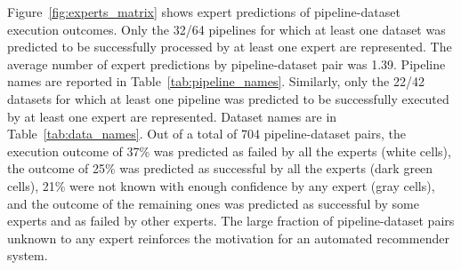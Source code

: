 \documentclass[conference]{IEEEtran}
\begin{document}
Figure~\ref{fig:experts_matrix} shows expert predictions of
pipeline-dataset execution outcomes. Only the 32/64 pipelines for which at
least one dataset was predicted to be successfully processed by at least
one expert are represented. The average number of expert predictions by pipeline-dataset pair was 1.39. Pipeline names are reported in
Table~\ref{tab:pipeline_names}. Similarly, only the 22/42 datasets for which
at least one pipeline was predicted to be successfully executed by at least
one expert are represented. Dataset names are in Table~\ref{tab:data_names}. Out of a total of 704 pipeline-dataset pairs,
the execution outcome of 37\% was predicted as failed by all the experts
(white cells), the outcome of 25\% was predicted as successful by all the
experts (dark green cells), 21\% were not known with enough confidence by
any expert (gray cells), and the outcome of the remaining ones was
predicted as successful by some experts and as failed by other experts. The
large fraction of pipeline-dataset pairs unknown to any expert reinforces
the motivation for an automated recommender system.
\end{document}
